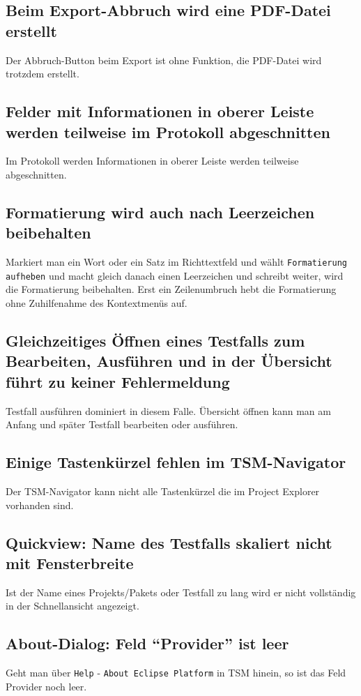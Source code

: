 \documentclass[11pt,a4paper,titlepage]{article}
\begin{document}
\subsection*{Beim Export-Abbruch wird eine PDF-Datei erstellt}
Der Abbruch-Button beim Export ist ohne Funktion, die PDF-Datei wird trotzdem erstellt.

\subsection*{Felder mit Informationen in oberer Leiste werden teilweise im Protokoll abgeschnitten}
Im Protokoll werden Informationen in oberer Leiste werden teilweise abgeschnitten.

\subsection*{Formatierung wird auch nach Leerzeichen beibehalten}
Markiert man ein Wort oder ein Satz im Richttextfeld und wählt \texttt{Formatierung aufheben} und macht gleich danach einen Leerzeichen und schreibt weiter, wird die Formatierung beibehalten.
Erst ein Zeilenumbruch hebt die Formatierung ohne Zuhilfenahme des Kontextmenüs auf.

\subsection*{Gleichzeitiges Öffnen eines Testfalls zum Bearbeiten, Ausführen und in der Übersicht führt zu keiner Fehlermeldung}
Testfall ausführen dominiert in diesem Falle. Übersicht öffnen kann man am Anfang und später Testfall bearbeiten oder ausführen.

\subsection*{Einige Tastenkürzel fehlen im TSM-Navigator}
Der TSM-Navigator kann nicht alle Tastenkürzel die im Project Explorer vorhanden sind.

\subsection*{Quickview: Name des Testfalls skaliert nicht mit Fensterbreite}
Ist der Name eines Projekts/Pakets oder Testfall zu lang wird er nicht vollständig in der Schnellansicht angezeigt.

\subsection*{About-Dialog: Feld "`Provider"' ist leer}
Geht man über \texttt{Help} - \texttt{About Eclipse Platform} in TSM hinein, so ist das Feld Provider noch leer.
\end{document}
